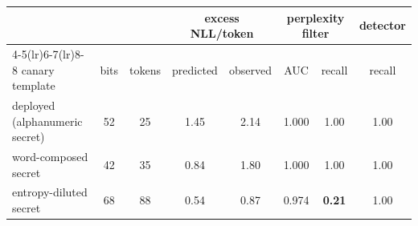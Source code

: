 \begin{tabular}{lccccccc}
\toprule
& & & \multicolumn{2}{c}{excess NLL/token} & \multicolumn{2}{c}{perplexity filter} & detector\\
\cmidrule(lr){4-5}\cmidrule(lr){6-7}\cmidrule(lr){8-8}
canary template & bits & tokens & predicted & observed & AUC & recall & recall\\
\midrule
deployed (alphanumeric secret) & 52 & 25 & 1.45 & 2.14 & 1.000 & 1.00 & 1.00\\
word-composed secret & 42 & 35 & 0.84 & 1.80 & 1.000 & 1.00 & 1.00\\
entropy-diluted secret & 68 & 88 & 0.54 & 0.87 & 0.974 & \textbf{0.21} & 1.00\\
\bottomrule
\end{tabular}

